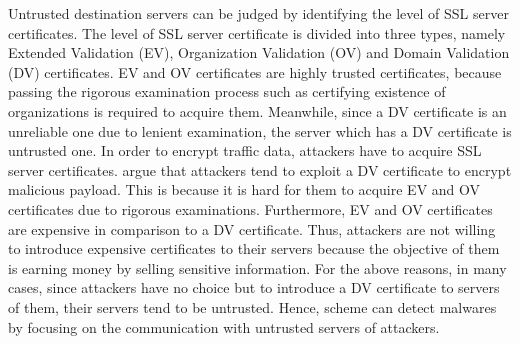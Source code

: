 Untrusted destination servers can be judged by identifying the level of SSL server certificates.  
The level of SSL server certificate is divided into three types, namely Extended Validation (EV), Organization Validation (OV) and Domain Validation (DV) certificates.
EV and OV certificates are highly trusted certificates, because passing the rigorous examination process such as certifying existence of organizations is required to acquire them. 
Meanwhile, since a DV certificate is an unreliable one due to lenient examination, the server which has a DV certificate is untrusted one.
In order to encrypt traffic data, attackers have to acquire SSL server certificates.
\We argue that attackers tend to exploit a DV certificate to encrypt malicious payload.
This is because it is hard for them to acquire EV and OV certificates due to rigorous examinations.
Furthermore, EV and OV certificates are expensive in comparison to a DV certificate.
Thus, attackers are not willing to introduce expensive certificates to their servers because the objective of them is earning money by selling sensitive information.
For the above reasons, in many cases, since attackers have no choice but to introduce a DV certificate to servers of them, their servers tend to be untrusted.
Hence, \our scheme can detect malwares by focusing on the communication with untrusted servers of attackers.

